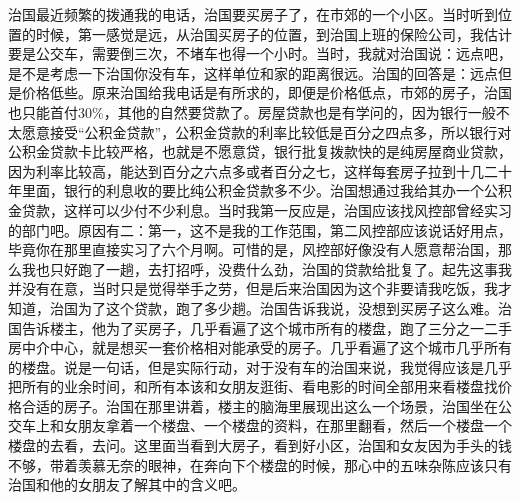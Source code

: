 治国最近频繁的拨通我的电话，治国要买房子了，在市郊的一个小区。当时听到位置的时候，第一感觉是远，从治国买房子的位置，到治国上班的保险公司，我估计要是公交车，需要倒三次，不堵车也得一个小时。当时，我就对治国说：远点吧，是不是考虑一下治国你没有车，这样单位和家的距离很远。治国的回答是：远点但是价格低些。原来治国给我电话是有所求的，即便是价格低点，市郊的房子，治国也只能首付30\%，其他的自然要贷款了。房屋贷款也是有学问的，因为银行一般不太愿意接受“公积金贷款”，公积金贷款的利率比较低是百分之四点多，所以银行对公积金贷款卡比较严格，也就是不愿意贷，银行批复拨款快的是纯房屋商业贷款，因为利率比较高，能达到百分之六点多或者百分之七，这样每套房子拉到十几二十年里面，银行的利息收的要比纯公积金贷款多不少。治国想通过我给其办一个公积金贷款，这样可以少付不少利息。当时我第一反应是，治国应该找风控部曾经实习的部门吧。原因有二：第一，这不是我的工作范围，第二风控部应该说话好用点，毕竟你在那里直接实习了六个月啊。可惜的是，风控部好像没有人愿意帮治国，那么我也只好跑了一趟，去打招呼，没费什么劲，治国的贷款给批复了。起先这事我并没有在意，当时只是觉得举手之劳，但是后来治国因为这个非要请我吃饭，我才知道，治国为了这个贷款，跑了多少趟。治国告诉我说，没想到买房子这么难。治国告诉楼主，他为了买房子，几乎看遍了这个城市所有的楼盘，跑了三分之一二手房中介中心，就是想买一套价格相对能承受的房子。几乎看遍了这个城市几乎所有的楼盘。说是一句话，但是实际行动，对于没有车的治国来说，我觉得应该是几乎把所有的业余时间，和所有本该和女朋友逛街、看电影的时间全部用来看楼盘找价格合适的房子。治国在那里讲着，楼主的脑海里展现出这么一个场景，治国坐在公交车上和女朋友拿着一个楼盘、一个楼盘的资料，在那里翻看，然后一个楼盘一个楼盘的去看，去问。这里面当看到大房子，看到好小区，治国和女友因为手头的钱不够，带着羡慕无奈的眼神，在奔向下个楼盘的时候，那心中的五味杂陈应该只有治国和他的女朋友了解其中的含义吧。

